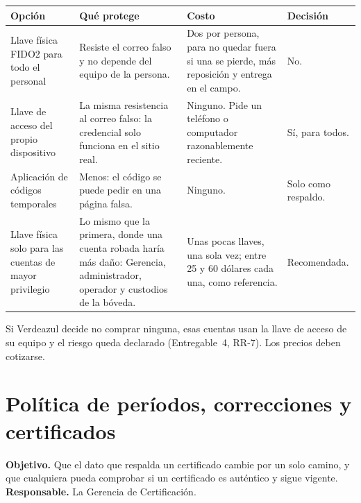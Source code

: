 \documentclass[11pt,letterpaper]{article}
\newcommand{\cab}[1]{\textbf{\rmfamily #1}}
\begin{document}
\begin{center}
\small
\renewcommand{\arraystretch}{1.2}
\begin{tabularx}{\textwidth}{@{}L{3.7cm} Y L{4.3cm} L{2.2cm}@{}}
\toprule
\cab{Opción} & \cab{Qué protege} & \cab{Costo} & \cab{Decisión} \\
\midrule
Llave física FIDO2 para todo el personal & Resiste el correo falso y no depende del equipo de la persona. & Dos por persona, para no quedar fuera si una se pierde, más reposición y entrega en el campo. & No. \\
Llave de acceso del propio dispositivo & La misma resistencia al correo falso: la credencial solo funciona en el sitio real. & Ninguno. Pide un teléfono o computador razonablemente reciente. & Sí, para todos. \\
Aplicación de códigos temporales & Menos: el código se puede pedir en una página falsa. & Ninguno. & Solo como respaldo. \\
Llave física solo para las cuentas de mayor privilegio & Lo mismo que la primera, donde una cuenta robada haría más daño: Gerencia, administrador, operador y custodios de la bóveda. & Unas pocas llaves, una sola vez; entre 25 y 60 dólares cada una, como referencia. & Recomendada. \\
\bottomrule
\end{tabularx}
\end{center}

Si Verdeazul decide no comprar ninguna, esas cuentas usan la llave de acceso de su equipo y el riesgo
queda declarado (Entregable~4, RR-7). Los precios deben cotizarse.

\section{Política de períodos, correcciones y certificados}
\label{sec:certificados}

\textbf{Objetivo.} Que el dato que respalda un certificado cambie por un solo camino, y que cualquiera
pueda comprobar si un certificado es auténtico y sigue vigente.
\textbf{Responsable.} La Gerencia de Certificación.
\end{document}
